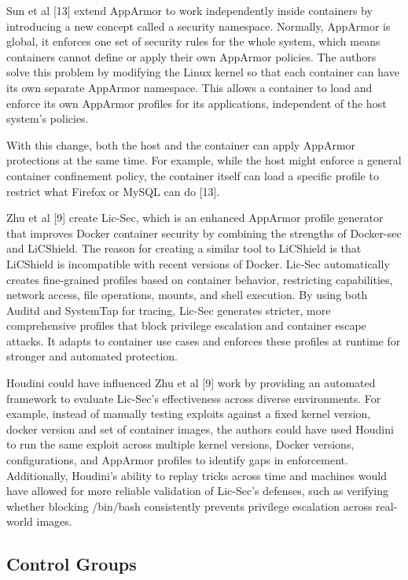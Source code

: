 \documentclass[12pt]{report}
\begin{document}
\begin{doublespace}
Sun et al [13] extend AppArmor to work independently inside containers by introducing a new concept called a security namespace. Normally, AppArmor is global, it enforces one set of security rules for the whole system, which means containers cannot define or apply their own AppArmor policies. The authors solve this problem by modifying the Linux kernel so that each container can have its own separate AppArmor namespace. This allows a container to load and enforce its own AppArmor profiles for its applications, independent of the host system's policies.

With this change, both the host and the container can apply AppArmor protections at the same time. For example, while the host might enforce a general container confinement policy, the container itself can load a specific profile to restrict what Firefox or MySQL can do [13]. 

Zhu et al [9] create Lic-Sec, which is an enhanced AppArmor profile generator that improves Docker container security by combining the strengths of Docker-sec and LiCShield. The reason for creating a similar tool to LiCShield is that LiCShield is incompatible with recent versions of Docker. Lic-Sec automatically creates fine-grained profiles based on container behavior, restricting capabilities, network access, file operations, mounts, and shell execution. By using both Auditd and SystemTap for tracing, Lic-Sec generates stricter, more comprehensive profiles that block privilege escalation and container escape attacks. It adapts to container use cases and enforces these profiles at runtime for stronger and automated protection.

Houdini could have influenced Zhu et al [9] work by providing an automated framework to evaluate Lic-Sec's effectiveness across diverse environments. For example, instead of manually testing exploits against a fixed kernel version, docker version and set of container images, the authors could have used Houdini to run the same exploit across multiple kernel versions, Docker versions, configurations, and AppArmor profiles to identify gaps in enforcement. Additionally, Houdini’s ability to replay tricks across time and machines would have allowed for more reliable validation of Lic-Sec’s defenses, such as verifying whether blocking /bin/bash consistently prevents privilege escalation across real-world images.






\subsection{Control Groups}


\end{doublespace}
\end{document}
